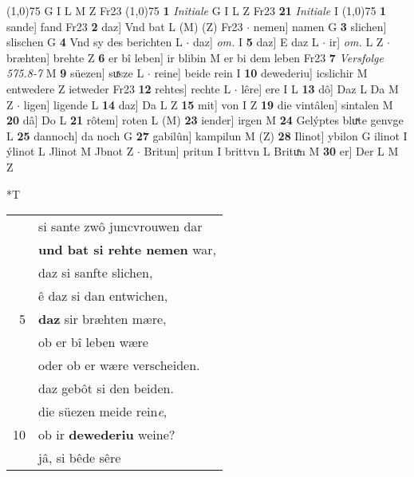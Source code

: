\documentclass[8pt,a4paper,notitlepage]{article}
\begin{document}
\begin{table}[ht]
\begin{minipage}[t]{0.5\linewidth}
\begin{tabular}{rl}
\end{tabular}
\scriptsize
\line(1,0){75} \newline
G I L M Z Fr23 \newline
\line(1,0){75} \newline
\textbf{1} \textit{Initiale} G I L Z Fr23  \textbf{21} \textit{Initiale} I  \newline
\line(1,0){75} \newline
\textbf{1} sande] fand Fr23 \textbf{2} daz] Vnd bat L (M) (Z) Fr23  $\cdot$ nemen] namen G \textbf{3} slichen] slischen G \textbf{4} Vnd sy des berichten L  $\cdot$ daz] \textit{om.} I \textbf{5} daz] E daz L  $\cdot$ ir] \textit{om.} L Z  $\cdot$ bræhten] brehte Z \textbf{6} er bî leben] ir blibin M er bi dem leben Fr23 \textbf{7} \textit{Versfolge 575.8-7} M  \textbf{9} süezen] suͯsze L  $\cdot$ reine] beide rein I \textbf{10} dewederiu] icslichir M entwedere Z ietweder Fr23 \textbf{12} rehtes] rechte L  $\cdot$ lêre] ere I L \textbf{13} dô] Daz L Da M Z  $\cdot$ ligen] ligende L \textbf{14} daz] Da L Z \textbf{15} mit] von I Z \textbf{19} die vintâlen] sintalen M \textbf{20} dâ] Do L \textbf{21} rôtem] roten L (M) \textbf{23} iender] irgen M \textbf{24} Gelýptes bluͯte genvge L \textbf{25} dannoch] da noch G \textbf{27} gabilûn] kampilun M (Z) \textbf{28} Ilinot] ybilon G ilinot I ýlinot L Jlinot M Jbnot Z  $\cdot$ Britun] pritun I brittvn L Brituͯn M \textbf{30} er] Der L M Z \newline
\end{minipage}
\hspace{0.5cm}
\begin{minipage}[t]{0.5\linewidth}
\small
\begin{center}*T
\end{center}
\begin{tabular}{rl}
 & si sante zwô juncvrouwen dar\\ 
 & \textbf{und bat si rehte nemen} war,\\ 
 & daz si sanfte slichen,\\ 
 & ê daz si dan entwichen,\\ 
5 & \textbf{daz} sir bræhten mære,\\ 
 & ob er bî leben wære\\ 
 & oder ob er wære verscheiden.\\ 
 & daz gebôt si den beiden.\\ 
 & die süezen meide rein\textit{e},\\ 
10 & ob ir \textbf{dewederiu} weine?\\ 
 & jâ, si bêde sêre\\ 

\end{tabular}
\end{minipage}
\end{table}
\end{document}
